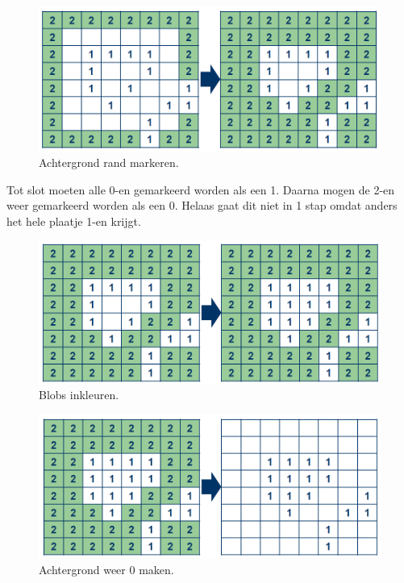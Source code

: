 \begin{figure}
    \begin{center}
        \includegraphics[scale=0.5]{figures/fill_holes_step2.png}
    \end{center}
    \caption{Achtergrond rand markeren.}
    \label{fig:fhstep2}
\end{figure}

Tot slot moeten alle 0-en gemarkeerd worden als een 1. Daarna mogen de 2-en 
weer gemarkeerd worden als een 0. Helaas gaat dit niet in 1 stap omdat anders 
het hele plaatje 1-en krijgt.

\begin{figure}
    \begin{center}
        \includegraphics[scale=0.5]{figures/fill_holes_step3.png}
    \end{center}
    \caption{Blobs inkleuren.}
    \label{fig:fhstep3}
\end{figure}

\begin{figure}
    \begin{center}
        \includegraphics[scale=0.5]{figures/fill_holes_step4.png}
    \end{center}
    \caption{Achtergrond weer 0 maken.}
    \label{fig:fhstep4}
\end{figure}

